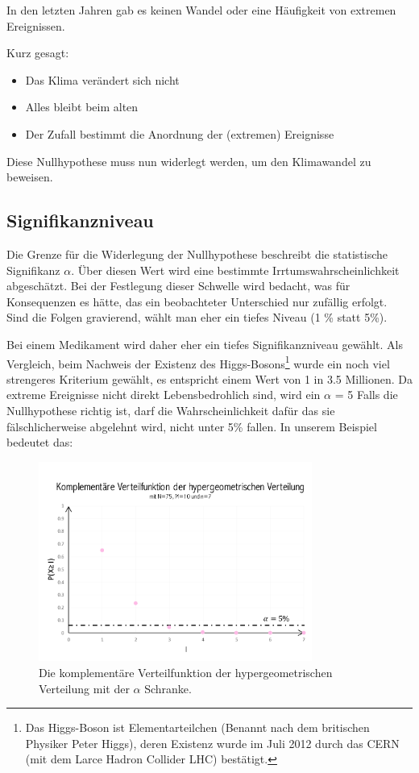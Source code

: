 \begin{refsection}
In den letzten Jahren gab es keinen Wandel oder eine Häufigkeit von extremen Ereignissen. 

Kurz gesagt:
\begin{itemize}
\item Das Klima verändert sich nicht
\item Alles bleibt beim alten
\item Der Zufall bestimmt die Anordnung der (extremen) Ereignisse
\end{itemize}

Diese Nullhypothese muss nun widerlegt werden, um den Klimawandel zu beweisen.

\subsection{Signifikanzniveau}
Die Grenze für die Widerlegung der Nullhypothese beschreibt die statistische Signifikanz $\alpha$. Über diesen Wert wird eine bestimmte Irrtumswahrscheinlichkeit abgeschätzt. 
Bei der Festlegung dieser Schwelle wird bedacht, was für Konsequenzen es hätte, das ein beobachteter Unterschied nur zufällig erfolgt. Sind die Folgen gravierend, wählt man eher ein tiefes Niveau (1 \% statt 5\%).

Bei einem Medikament wird daher eher ein tiefes Signifikanzniveau gewählt. Als Vergleich, beim Nachweis der Existenz des Higgs-Bosons\footnote{%
Das Higgs-Boson ist Elementarteilchen (Benannt nach dem britischen Physiker Peter Higgs), deren Existenz wurde im Juli 2012 durch das CERN (mit dem Larce Hadron Collider LHC) bestätigt.} wurde ein noch viel strengeres Kriterium gewählt, es entspricht einem Wert von 1 in 3.5 Millionen. Da extreme Ereignisse nicht direkt Lebensbedrohlich sind, wird ein $\alpha$ = 5%
Falls die Nullhypothese richtig ist, darf die Wahrscheinlichkeit dafür das sie fälschlicherweise abgelehnt wird, nicht unter 5\% fallen.
In unserem Beispiel bedeutet das:

\begin{figure}[htbp]
\centering
\includegraphics[width=0.8\textwidth]{extrem/Signi.pdf}
\caption{Die komplementäre Verteilfunktion der hypergeometrischen Verteilung mit der $\alpha$ Schranke.}
\label{Signifikanzniveau}
\end{figure}


\end{refsection}
